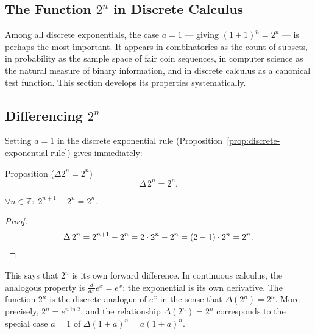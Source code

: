 
\subsection{\texorpdfstring{The Function \(2^n\) in Discrete Calculus}{The Function 2 to the n in Discrete Calculus}}
\label{subsec:two-to-the-n}

Among all discrete exponentials, the case \(a = 1\) --- giving \((1+1)^n = 2^n\)
--- is perhaps the most important. It appears in combinatorics as the count
of subsets, in probability as the sample space of fair coin sequences, in
computer science as the natural measure of binary information, and in discrete
calculus as a canonical test function. This section develops its properties
systematically.

\subsection*{\texorpdfstring{Differencing \(2^n\)}{Differencing 2 to the n}}

Setting \(a = 1\) in the discrete exponential rule
(Proposition~\ref{prop:discrete-exponential-rule}) gives immediately:

\begin{propositionbox}{Proposition (\(\Delta 2^n = 2^n\))}
\[
\Delta\, 2^n = 2^n.
\]
\end{propositionbox}
\label{prop:delta-two-n}

\begin{remark*}
\(\forall n \in \mathbb{Z}:\; 2^{n+1} - 2^n = 2^n\).
\end{remark*}

\begin{proof}
\[
\Delta\, 2^n = 2^{n+1} - 2^n = 2\cdot 2^n - 2^n = (2-1)\cdot 2^n = 2^n. \qedhere
\]
\end{proof}

\begin{remark*}
This says that \(2^n\) is its own forward difference. In continuous calculus,
the analogous property is \(\tfrac{d}{dx}e^x = e^x\): the exponential is its
own derivative. The function \(2^n\) is the discrete analogue of \(e^x\)
in the sense that \(\Delta(2^n) = 2^n\). More precisely, \(2^n = e^{n \ln 2}\),
and the relationship \(\Delta(2^n) = 2^n\) corresponds to the special case
\(a = 1\) of \(\Delta(1+a)^n = a(1+a)^n\).
\end{remark*}

